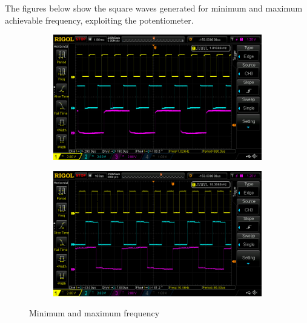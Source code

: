 \documentclass[12pt]{article}
\begin{document}
The figures below show the square waves generated for minimum and maximum achievable frequency, exploiting the potentiometer.


\begin{figure}[h!]
	\centering
	\begin{subfigure}{0.5\textwidth}
		\includegraphics[scale = 0.25]{immagini/DS1Z_QuickPrint14.png}
	\end{subfigure}%
	\begin{subfigure}{0.4\textwidth}
		\includegraphics[scale = 0.25]{immagini/DS1Z_QuickPrint15.png}
	\end{subfigure}
	\caption{Minimum and maximum frequency}
\end{figure}
\end{document}
